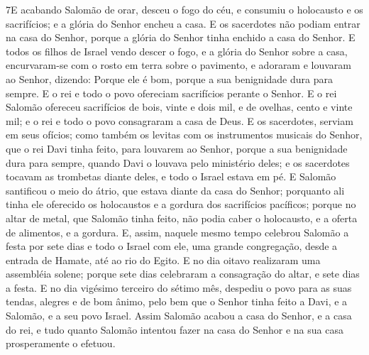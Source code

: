 \medskip

\lettrine{7} E acabando Salomão de orar, desceu o fogo do céu,
e consumiu o holocausto e os sacrifícios; e a glória do Senhor
encheu a casa. E os sacerdotes não podiam entrar na casa do
Senhor, porque a glória do Senhor tinha enchido a casa do Senhor.
E todos os filhos de Israel vendo descer o fogo, e a glória do
Senhor sobre a casa, encurvaram-se com o rosto em terra sobre o
pavimento, e adoraram e louvaram ao Senhor, dizendo: Porque ele é
bom, porque a sua benignidade dura para sempre. E o rei e todo o
povo ofereciam sacrifícios perante o Senhor. E o rei Salomão
ofereceu sacrifícios de bois, vinte e dois mil, e de ovelhas, cento
e vinte mil; e o rei e todo o povo consagraram a casa de Deus. E
os sacerdotes, serviam em seus ofícios; como também os levitas com
os instrumentos musicais do Senhor, que o rei Davi tinha feito, para
louvarem ao Senhor, porque a sua benignidade dura para sempre,
quando Davi o louvava pelo ministério deles; e os sacerdotes tocavam
as trombetas diante deles, e todo o Israel estava em pé. E
Salomão santificou o meio do átrio, que estava diante da casa do
Senhor; porquanto ali tinha ele oferecido os holocaustos e a gordura
dos sacrifícios pacíficos; porque no altar de metal, que Salomão
tinha feito, não podia caber o holocausto, e a oferta de alimentos,
e a gordura. E, assim, naquele mesmo tempo celebrou Salomão a
festa por sete dias e todo o Israel com ele, uma grande congregação,
desde a entrada de Hamate, até ao rio do Egito. E no dia oitavo
realizaram uma assembléia solene; porque sete dias celebraram a
consagração do altar, e sete dias a festa. E no dia vigésimo
terceiro do sétimo mês, despediu o povo para as suas tendas, alegres
e de bom ânimo, pelo bem que o Senhor tinha feito a Davi, e a
Salomão, e a seu povo Israel. Assim Salomão acabou a casa do
Senhor, e a casa do rei, e tudo quanto Salomão intentou fazer na
casa do Senhor e na sua casa prosperamente o efetuou.

